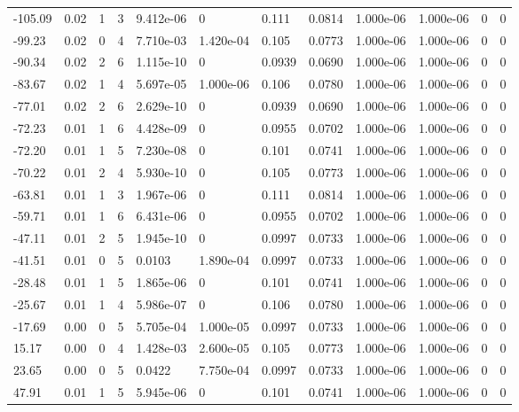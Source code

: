 \documentclass[preview]{standalone}
\begin{document}
{{\begin{tabular}{L{1.2cm}C{1.2cm} C{0.3cm}C{0.5cm} C{1.4cm}C{1.4cm} C{1.4cm}C{1.4cm} C{1.6cm}C{1.6cm} C{1.6cm}C{1.6cm}}
  -105.09  &  0.02  & 1     &  3 &  9.412e-06  & 0  &  0.111&   0.0814& 1.000e-06 & 1.000e-06   &  0 & 0  \\ 
  -99.23  &  0.02  & 0     &  4 &  7.710e-03  & 1.420e-04  &  0.105&   0.0773& 1.000e-06 & 1.000e-06   &  0 & 0  \\ 
  -90.34  &  0.02  & 2     &  6 &  1.115e-10  & 0  &  0.0939&   0.0690& 1.000e-06 & 1.000e-06   &  0 & 0  \\ 
  -83.67  &  0.02  & 1     &  4 &  5.697e-05  & 1.000e-06  &  0.106&   0.0780& 1.000e-06 & 1.000e-06   &  0 & 0  \\ 
  -77.01  &  0.02  & 2     &  6 &  2.629e-10  & 0  &  0.0939&   0.0690& 1.000e-06 & 1.000e-06   &  0 & 0  \\ 
  -72.23  &  0.01  & 1     &  6 &  4.428e-09  & 0  &  0.0955&   0.0702& 1.000e-06 & 1.000e-06   &  0 & 0  \\ 
  -72.20  &  0.01  & 1     &  5 &  7.230e-08  & 0  &  0.101&   0.0741& 1.000e-06 & 1.000e-06   &  0 & 0  \\ 
  -70.22  &  0.01  & 2     &  4 &  5.930e-10  & 0  &  0.105&   0.0773& 1.000e-06 & 1.000e-06   &  0 & 0  \\ 
  -63.81  &  0.01  & 1     &  3 &  1.967e-06  & 0  &  0.111&   0.0814& 1.000e-06 & 1.000e-06   &  0 & 0  \\ 
  -59.71  &  0.01  & 1     &  6 &  6.431e-06  & 0  &  0.0955&   0.0702& 1.000e-06 & 1.000e-06   &  0 & 0  \\ 
  -47.11  &  0.01  & 2     &  5 &  1.945e-10  & 0  &  0.0997&   0.0733& 1.000e-06 & 1.000e-06   &  0 & 0  \\ 
  -41.51  &  0.01  & 0     &  5 &  0.0103  & 1.890e-04  &  0.0997&   0.0733& 1.000e-06 & 1.000e-06   &  0 & 0  \\ 
  -28.48  &  0.01  & 1     &  5 &  1.865e-06  & 0  &  0.101&   0.0741& 1.000e-06 & 1.000e-06   &  0 & 0  \\ 
  -25.67  &  0.01  & 1     &  4 &  5.986e-07  & 0  &  0.106&   0.0780& 1.000e-06 & 1.000e-06   &  0 & 0  \\ 
  -17.69  &  0.00  & 0     &  5 &  5.705e-04  & 1.000e-05  &  0.0997&   0.0733& 1.000e-06 & 1.000e-06   &  0 & 0  \\ 
  15.17  &  0.00  & 0     &  4 &  1.428e-03  & 2.600e-05  &  0.105&   0.0773& 1.000e-06 & 1.000e-06   &  0 & 0  \\ 
  23.65  &  0.00  & 0     &  5 &  0.0422  & 7.750e-04  &  0.0997&   0.0733& 1.000e-06 & 1.000e-06   &  0 & 0  \\ 
  47.91  &  0.01  & 1     &  5 &  5.945e-06  & 0  &  0.101&   0.0741& 1.000e-06 & 1.000e-06   &  0 & 0  \\ 

\end{tabular}}}
\end{document}
